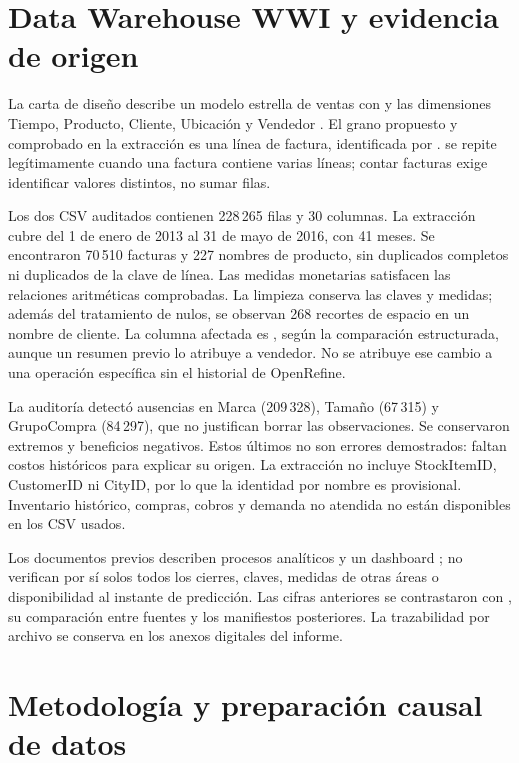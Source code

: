 \barrerapagina
\section{Data Warehouse WWI y evidencia de origen}
La carta de diseño describe un modelo estrella de ventas con  y las dimensiones Tiempo, Producto, Cliente, Ubicación y Vendedor \cite{carta}. El grano propuesto y comprobado en la extracción es una línea de factura, identificada por .  se repite legítimamente cuando una factura contiene varias líneas; contar facturas exige identificar valores distintos, no sumar filas.

Los dos CSV auditados contienen 228\,265 filas y 30 columnas. La extracción cubre del 1 de enero de 2013 al 31 de mayo de 2016, con 41 meses. Se encontraron 70\,510 facturas y 227 nombres de producto, sin duplicados completos ni duplicados de la clave de línea. Las medidas monetarias satisfacen las relaciones aritméticas comprobadas. La limpieza conserva las claves y medidas; además del tratamiento de nulos, se observan 268 recortes de espacio en un nombre de cliente. La columna afectada es , según la comparación estructurada, aunque un resumen previo lo atribuye a vendedor. No se atribuye ese cambio a una operación específica sin el historial de OpenRefine.

La auditoría detectó ausencias en Marca (209\,328), Tamaño (67\,315) y GrupoCompra (84\,297), que no justifican borrar las observaciones. Se conservaron extremos y beneficios negativos. Estos últimos no son errores demostrados: faltan costos históricos para explicar su origen. La extracción no incluye StockItemID, CustomerID ni CityID, por lo que la identidad por nombre es provisional. Inventario histórico, compras, cobros y demanda no atendida no están disponibles en los CSV usados.

Los documentos previos describen procesos analíticos y un dashboard \cite{limpieza,dashboard}; no verifican por sí solos todos los cierres, claves, medidas de otras áreas o disponibilidad al instante de predicción. Las cifras anteriores se contrastaron con , su comparación entre fuentes y los manifiestos posteriores. La trazabilidad por archivo se conserva en los anexos digitales del informe.

\section{Metodología y preparación causal de datos}
